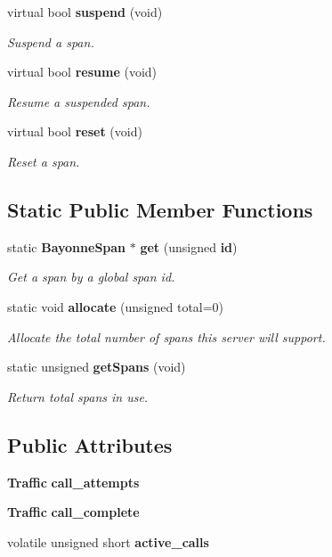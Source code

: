 \begin{DoxyCompactItemize}
virtual bool {\bf suspend} (void)
\begin{DoxyCompactList}\small\item\em Suspend a span. \item\end{DoxyCompactList}\item 
virtual bool {\bf resume} (void)
\begin{DoxyCompactList}\small\item\em Resume a suspended span. \item\end{DoxyCompactList}\item 
virtual bool {\bf reset} (void)
\begin{DoxyCompactList}\small\item\em Reset a span. \item\end{DoxyCompactList}\end{DoxyCompactItemize}
\subsection*{Static Public Member Functions}
\begin{DoxyCompactItemize}
\item 
static {\bf BayonneSpan} $\ast$ {\bf get} (unsigned {\bf id})
\begin{DoxyCompactList}\small\item\em Get a span by a global span id. \item\end{DoxyCompactList}\item 
static void {\bf allocate} (unsigned total=0)
\begin{DoxyCompactList}\small\item\em Allocate the total number of spans this server will support. \item\end{DoxyCompactList}\item 
static unsigned {\bf getSpans} (void)
\begin{DoxyCompactList}\small\item\em Return total spans in use. \item\end{DoxyCompactList}\end{DoxyCompactItemize}
\subsection*{Public Attributes}
\begin{DoxyCompactItemize}
\item 
{\bf Traffic} {\bf call\_\-attempts}
\item 
{\bf Traffic} {\bf call\_\-complete}
\item 
volatile unsigned short {\bf active\_\-calls}
\end{DoxyCompactItemize}
